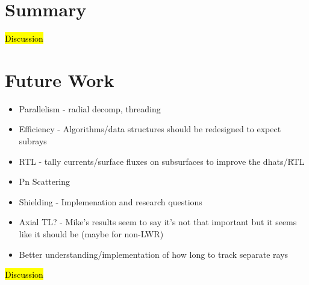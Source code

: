 \section{Summary}

\hl{Discussion}

\section{Future Work}

\begin{itemize}
    \item Parallelism - radial decomp, threading
    \item Efficiency - Algorithms/data structures should be redesigned to expect subrays
    \item RTL - tally currents/surface fluxes on subsurfaces to improve the dhats/RTL
    \item Pn Scattering
    \item Shielding - Implemenation and research questions
    \item Axial TL? - Mike's results seem to say it's not that important but it seems like it should be (maybe for non-LWR)
    \item Better understanding/implementation of how long to track separate rays
\end{itemize}

\hl{Discussion}